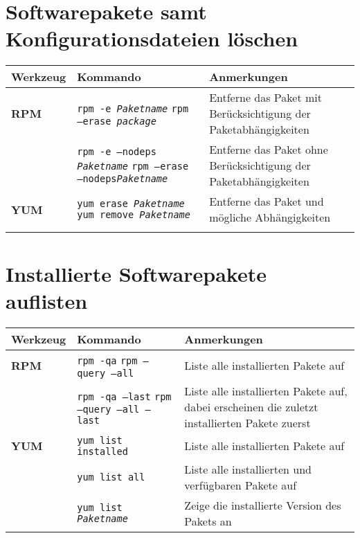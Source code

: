 \documentclass[10pt,a4paper]{article}
\begin{document}
\section{Softwarepakete samt Konfigurationsdateien löschen}
\begin{tabular}{ p{3.5cm} p{9cm} p{11cm}}
  \hline
  \rowcolor{Gray}
  \textbf{Werkzeug} & \textbf{Kommando} & \textbf{Anmerkungen} \\
  \hline 
  \textbf{RPM} & \texttt{rpm -e \textit{Paketname}} \newline \texttt{rpm --erase \textit{package}} & Entferne das Paket mit Berücksichtigung der Paketabhängigkeiten\\
  \rowcolor{Gray}
  & \texttt{rpm -e --nodeps \textit{Paketname}} \newline \texttt{rpm --erase  --nodeps\textit{Paketname}} & Entferne das Paket ohne Berücksichtigung der Paketabhängigkeiten\\
  \textbf{YUM} & \texttt{yum erase \textit{Paketname}} \newline \texttt{yum remove \textit{Paketname}} & Entferne das Paket und mögliche Abhängigkeiten\\
  \rowcolor{Gray}
  \hline
\end{tabular}

\newpage

\cheatsheet

\section{Installierte Softwarepakete auflisten}
\begin{tabular}{ p{3.5cm} p{9cm} p{11cm}}
  \hline
  \rowcolor{Gray}
  \textbf{Werkzeug} & \textbf{Kommando} & \textbf{Anmerkungen} \\
  \hline 
  \textbf{RPM} & \texttt{rpm -qa} \newline \texttt{rpm --query --all} & Liste alle installierten Pakete auf\\
  \rowcolor{Gray}
  & \texttt{rpm -qa --last} \newline \texttt{rpm --query --all --last} & Liste alle installierten Pakete auf, dabei erscheinen die zuletzt installierten Pakete zuerst\\
  \textbf{YUM} & \texttt{yum list installed} & Liste alle installierten Pakete auf\\
  \rowcolor{Gray}
  & \texttt{yum list all} & Liste alle installierten und verfügbaren Pakete auf\\
  & \texttt{yum list \textit{Paketname}} & Zeige die installierte Version des Pakets an\\
  \hline
\end{tabular}
\end{document}
